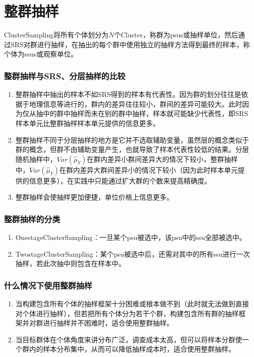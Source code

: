 \section{整群抽样}
\begin{definition}
	\gls{ClusterSampling}将所有个体划分为$N$个\gls{Cluster}，称群为\gls{psus}或抽样单位，然后通过SRS对群进行抽样，在抽出的每个群中使用独立的抽样方法得到最终的样本，称个体为\gls{ssus}或观察单位。
\end{definition}
\subsubsection{整群抽样与SRS、分层抽样的比较}
\begin{enumerate}
	\item 整群抽样中抽出的样本不如SRS得到的样本有代表性。因为群的划分往往是依据于地理信息等进行的，群内的差异往往较小，群间的差异可能较大。此时因为仅从抽中的群中抽样而未在别的群中抽样，样本就可能缺少代表性，即SRS样本单元比整群抽样样本单元提供的信息更多。
	\item 整群抽样不同于分层抽样的地方是它并不选取辅助变量，虽然层的概念类似于群的概念，但群不由辅助变量产生，也就导致了样本代表性较低的结果。分层随机抽样中，$Var(\hat{\mu}_Y)$在群内差异小群间差异大的情况下较小，整群抽样中，$Var(\hat{\mu}_Y)$在群内差异大群间差异小的情况下较小（因为此时样本单元提供的信息更多），在实践中只能通过扩大群的个数来提高精确度。
	\item 整群抽样会使抽样更加便捷，单位价格上信息更多。
\end{enumerate}
\subsubsection{整群抽样的分类}
\begin{enumerate}
	\item \gls{OnestageClusterSampling}：一旦某个psu被选中，该psu中的ssu全部被选中。
	\item \gls{TwostageClusterSampling}：某个psu被选中后，还需对其中的所有ssu进行一次抽样，若此次抽中则包含在样本中。
\end{enumerate}
\subsubsection{什么情况下使用整群抽样}
\begin{enumerate}
	\item 当构建包含所有个体的抽样框架十分困难或根本做不到（此时就无法做到直接对个体进行抽样），但若把所有个体分为若干个群，构建包含所有群的抽样框架并对群进行抽样并不困难时，适合使用整群抽样。
	\item 当目标群体在个体角度来讲分布广泛，调查成本太高，但可以将样本分群使一个群内的样本分布集中，从而可以降低抽样成本时，适合使用整群抽样。
\end{enumerate}

